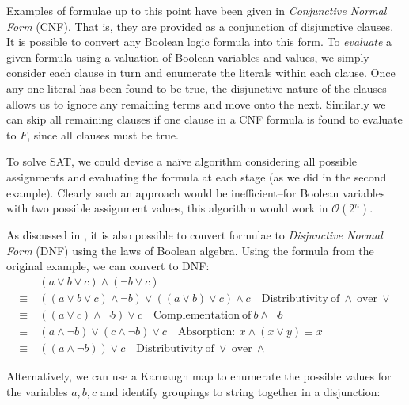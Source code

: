 \documentclass[a4paper,openany,12pt]{book}
\begin{document}
Examples of formulae up to this point have been given in \emph{Conjunctive Normal Form} (CNF).
That is, they are provided as a conjunction of disjunctive clauses.
It is possible to convert any Boolean logic formula into this form.
To \emph{evaluate} a given formula using a valuation of Boolean variables and values, we simply consider each clause in
turn and enumerate the literals within each clause.
Once any one literal has been found to be true, the disjunctive nature of the clauses allows us to ignore any remaining
terms and move onto the next.
Similarly we can skip all remaining clauses if one clause in a CNF formula is found to evaluate to $F$, since all
clauses must be true.

To solve SAT, we could devise a naïve algorithm considering all possible assignments and evaluating the formula at each
stage (as we did in the second example).
Clearly such an approach would be inefficient--for Boolean variables with two possible assignment values, this algorithm
would work in $\mathcal{O}(2^n)$.

As discussed in \citet{miltersen2005converting}, it is also possible to convert formulae to \emph{Disjunctive Normal
Form} (DNF) using the laws of Boolean algebra.
Using the formula from the original example, we can convert to DNF:
\begin{align*} & (a \lor b \lor c) \land (\neg b \lor c) \\
   \equiv~ & ((a \lor b \lor c) \land \neg b) \lor ((a \lor b) \lor c) \land c\quad \mathrm{Distributivity~of}~\land~\mathrm{over}~\lor \\
   \equiv~  & ((a \lor c) \land \neg b) \lor c\quad  \mathrm{Complementation~of}~b \land \neg b \\
   \equiv~  & (a \land \neg b) \lor (c \land \neg b) \lor c\quad \mathrm{Absorption:}~x \land (x \lor y) \equiv x \\
   \equiv~  & ((a \land \neg b)) \lor c\quad  \mathrm{Distributivity~of}~\lor~\mathrm{over}~\land
\end{align*}

Alternatively, we can use a Karnaugh map to enumerate the possible values for the variables $a, b, c$ and identify
groupings to string together in a disjunction:

\begin{Karnaughvuit}
\end{Karnaughvuit}
\end{document}
